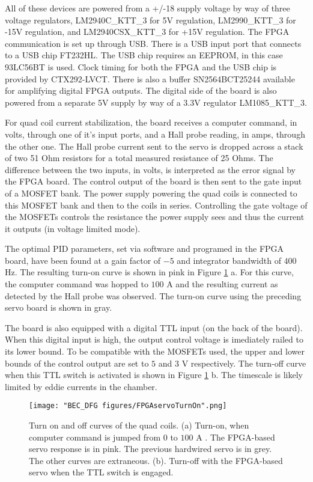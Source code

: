 All of these devices are powered from a +/-18 supply voltage by way of three voltage regulators, LM2940C\_KTT\_3 for 5V regulation, LM2990\_KTT\_3 for -15V regulation, and LM2940CSX\_KTT\_3 for +15V regulation. The FPGA communication is set up through USB. There is a USB input port that connects to a USB chip FT232HL. The USB chip requires an EEPROM, in this case 93LC56BT is used. Clock timing for both the FPGA and the USB chip is provided by  CTX292-LVCT. There is also a buffer SN2564BCT25244 available for amplifying digital FPGA outputs. The digital side of the board is also powered from a separate 5V supply by way of a 3.3V regulator LM1085\_KTT\_3.

For quad coil current stabilization, the board receives a computer command, in volts, through one of it's input ports, and a Hall probe reading, in amps, through the other one.  The Hall probe current sent to the servo is dropped across a stack of two 51 Ohm resistors for a total measured resistance of 25 Ohms. The difference between the two inputs, in volts, is interpreted as the error signal by the FPGA board. The control output of the board is then sent to the gate input of a MOSFET bank. The power supply powering the quad coils is connected to this MOSFET bank and then to the coils in series. Controlling the gate voltage of the MOSFETs controls the resistance the power supply sees and thus the current it outputs (in voltage limited mode).  

The optimal PID parameters, set via software and programed in the FPGA board, have been found at a gain factor of $-5$ and integrator bandwidth of $400$ Hz. The resulting turn-on curve is shown in pink in Figure \ref{fig:FPGAservoTurnOn} a. For this curve, the computer command was hopped to $100$ A and the resulting current as detected by the Hall probe was observed. The turn-on curve using the preceding servo board is shown in gray. 

The board is also equipped with a digital TTL input (on the back of the board). When this digital input is high, the output control voltage is imediately railed to its lower bound. To be compatible with the MOSFETs used, the upper and lower bounds of the control output are set to $5$ and $3$ V respectively. The turn-off curve when this TTL switch is activated is shown in  Figure \ref{fig:FPGAservoTurnOn} b. The timescale is likely limited by eddie currents in the chamber. 

\begin{figure}
	\texttt{[image: "BEC\_DFG figures/FPGAservoTurnOn".png]}
\caption[Turn on and off curves of the quad coils]{Turn on and off curves of the quad coils. (a) Turn-on, when computer command is jumped from $0$ to $100$ A . The FPGA-based servo response is in pink. The previous hardwired servo is in grey. The other curves are extraneous. (b). Turn-off with the FPGA-based servo when the TTL switch is engaged.}
\label{fig:FPGAservoTurnOn}
\end{figure}

